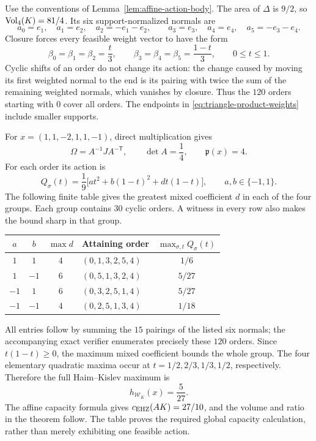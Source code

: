 Use the conventions of Lemma~\ref{lem:affine-action-body}. The area of
$\Delta$ is $9/2$, so $\operatorname{Vol}_4(K)=81/4$. Its six support-normalized normals are
\[
 a_0=e_1,\quad a_1=e_2,\quad a_2=-e_1-e_2,\qquad
 a_3=e_3,\quad a_4=e_4,\quad a_5=-e_3-e_4.
\]
Closure forces every feasible weight vector to have the form
\begin{equation}\label{eq:triangle-product-weights}
 \beta_0=\beta_1=\beta_2=\frac t3,\qquad
 \beta_3=\beta_4=\beta_5=\frac{1-t}{3},\qquad 0\leq t\leq1.
\end{equation}
Cyclic shifts of an order do not change its action: the change caused by
moving its first weighted normal to the end is its pairing with twice the
sum of the remaining weighted normals, which vanishes by closure. Thus the
$120$ orders starting with $0$ cover all orders. The endpoints in
\eqref{eq:triangle-product-weights} include smaller supports.

For $x=(1,1,-2,1,1,-1)$, direct multiplication gives
\[
 \Omega=A^{-1}JA^{-\mathsf T},\qquad
 \det A=\frac14,\qquad \mathfrak p(x)=4.
\]
For each order its action is
\[
 Q_\sigma(t)=\frac19\bigl[a t^2+b(1-t)^2+d t(1-t)\bigr],
 \qquad a,b\in\{-1,1\}.
\]
The following finite table gives the greatest mixed coefficient $d$ in
each of the four groups. Each group contains $30$ cyclic orders. A witness
in every row also makes the bound sharp in that group.
\begin{center}
\begin{tabular}{ccclc}
\toprule
$a$&$b$&$\max d$&Attaining order&$\max_{\sigma,t} Q_\sigma(t)$\\
\midrule
$1$&$1$&$4$&$(0,1,3,2,5,4)$&$1/6$\\
$1$&$-1$&$6$&$(0,5,1,3,2,4)$&$5/27$\\
$-1$&$1$&$6$&$(0,3,2,5,1,4)$&$5/27$\\
$-1$&$-1$&$4$&$(0,2,5,1,3,4)$&$1/18$\\
\bottomrule
\end{tabular}
\end{center}
All entries follow by summing the $15$ pairings of the listed six normals;
the accompanying exact verifier enumerates precisely these $120$ orders.
Since $t(1-t)\geq0$, the maximum mixed coefficient bounds the whole group.
The four elementary quadratic maxima occur at $t=1/2,2/3,1/3,1/2$,
respectively. Therefore the full Haim--Kislev maximum is
\[
 h_{\mathcal W_K}(x)=\frac5{27}.
\]
The affine capacity formula gives $c_{\mathrm{EHZ}}(AK)=27/10$, and the volume and
ratio in the theorem follow. The table proves the required global capacity
calculation, rather than merely exhibiting one feasible action.


